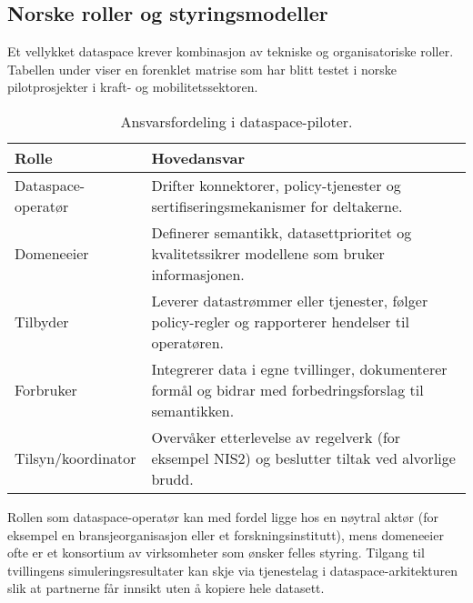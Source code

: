 \subsection{Norske roller og styringsmodeller}
Et vellykket dataspace krever kombinasjon av tekniske og organisatoriske roller. Tabellen under viser en forenklet matrise som
har blitt testet i norske pilotprosjekter i kraft- og mobilitetssektoren.

\begin{table}[ht]
    \centering
    \caption{Ansvarsfordeling i dataspace-piloter.}
    \label{tab:kap03-dataspace-ansvar}
    \begin{tabular}{p{}p{}}
        \toprule
        \textbf{Rolle} & \textbf{Hovedansvar} \\
        \midrule
        Dataspace-operatør & Drifter konnektorer, policy-tjenester og sertifiseringsmekanismer for deltakerne. \\
        Domeneeier & Definerer semantikk, datasettprioritet og kvalitetssikrer modellene som bruker informasjonen. \\
        Tilbyder & Leverer datastrømmer eller tjenester, følger policy-regler og rapporterer hendelser til operatøren. \\
        Forbruker & Integrerer data i egne tvillinger, dokumenterer formål og bidrar med forbedringsforslag til semantikken. \\
        Tilsyn/koordinator & Overvåker etterlevelse av regelverk (for eksempel NIS2) og beslutter tiltak ved alvorlige brudd. \\
        \bottomrule
    \end{tabular}
\end{table}

Rollen som dataspace-operatør kan med fordel ligge hos en nøytral aktør (for eksempel en bransjeorganisasjon eller et
forskningsinstitutt), mens domeneeier ofte er et konsortium av virksomheter som ønsker felles styring. Tilgang til tvillingens
simuleringsresultater kan skje via tjenestelag i dataspace-arkitekturen slik at partnerne får innsikt uten å kopiere hele
datasett.

